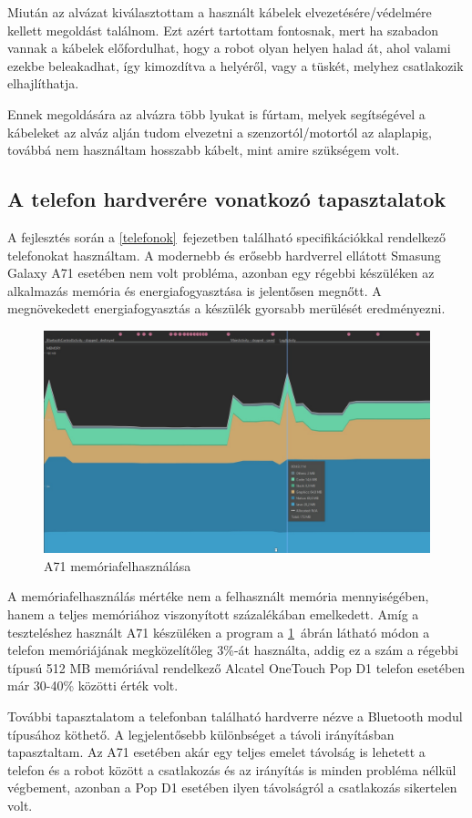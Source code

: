 \documentclass[]{thesis-ekf}
\theoremstyle{definition}
\begin{document}
Miután az alvázat kiválasztottam a használt kábelek elvezetésére/védelmére kellett megoldást találnom. Ezt azért tartottam fontosnak, mert ha szabadon vannak a kábelek előfordulhat, hogy a robot olyan helyen halad át, ahol valami ezekbe beleakadhat, így kimozdítva a helyéről, vagy a tüskét, melyhez csatlakozik elhajlíthatja.

Ennek megoldására az alvázra több lyukat is fúrtam, melyek segítségével a kábeleket az alváz alján tudom elvezetni a szenzortól/motortól az alaplapig, továbbá nem használtam hosszabb kábelt, mint amire szükségem volt.
\subsection{A telefon hardverére vonatkozó tapasztalatok}\label{phone_hardware}
A fejlesztés során a \ref{telefonok}~fejezetben található specifikációkkal rendelkező telefonokat használtam. A modernebb és erősebb hardverrel ellátott Smasung Galaxy A71 esetében nem volt probléma, azonban egy régebbi készüléken az alkalmazás memória és energiafogyasztása is jelentősen megnőtt. A megnövekedett energiafogyasztás a készülék gyorsabb merülését eredményezni.
\begin{figure}[h]
	\centering
	\includegraphics[width=0.8\columnwidth]{images/ram_usage}
	\caption{A71 memóriafelhasználása}
	\label{ram_usage}
\end{figure}

A memóriafelhasználás mértéke nem a felhasznált memória mennyiségében, hanem a teljes memóriához viszonyított százalékában emelkedett. Amíg a teszteléshez használt A71 készüléken a program a \ref{ram_usage}~ábrán látható módon a telefon memóriájának megközelítőleg 3\%-át használta, addig ez a szám a régebbi típusú 512 MB memóriával rendelkező Alcatel OneTouch Pop D1 telefon esetében már 30-40\% közötti érték volt.

További tapasztalatom a telefonban található hardverre nézve a Bluetooth modul típusához köthető. A legjelentősebb különbséget a távoli irányításban tapasztaltam. Az A71 esetében akár egy teljes emelet távolság is lehetett a telefon és a robot között a csatlakozás és az irányítás is minden probléma nélkül végbement, azonban a Pop D1 esetében ilyen távolságról a csatlakozás sikertelen volt.
\end{document}
